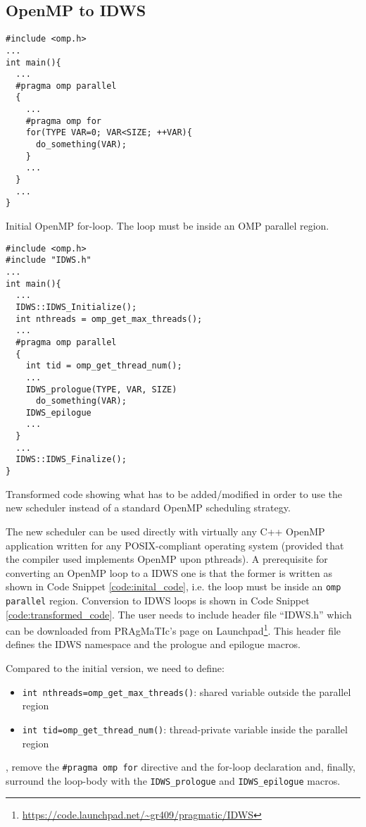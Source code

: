 \documentclass{acm_proc_article-sp}
\newcommand{\PRAGMATIC}{PRAgMaTIc\xspace}
\begin{document}
\subsection{OpenMP to IDWS}
\label{subsect:conversion}
\begin{code}[h]
\begin{lstlisting}
#include <omp.h>
...
int main(){
  ...
  #pragma omp parallel
  {
    ...
    #pragma omp for
    for(TYPE VAR=0; VAR<SIZE; ++VAR){
      do_something(VAR);
    }
    ...
  }
  ...
}
\end{lstlisting}
\caption{Initial OpenMP for-loop. The loop must be inside an OMP parallel 
region.}
\label{code:inital_code}
\end{code}

\begin{code}[h]
\begin{lstlisting}
#include <omp.h>
#include "IDWS.h"
...
int main(){
  ...
  IDWS::IDWS_Initialize();
  int nthreads = omp_get_max_threads();
  ...
  #pragma omp parallel
  {
    int tid = omp_get_thread_num();
    ...
    IDWS_prologue(TYPE, VAR, SIZE)
      do_something(VAR);
    IDWS_epilogue
    ...
  }
  ...
  IDWS::IDWS_Finalize();
}
\end{lstlisting}
\caption{Transformed code showing what has to be added/modified in order to use 
the new scheduler instead of a standard OpenMP scheduling strategy.}
\label{code:transformed_code}
\end{code}

The new scheduler can be used directly with virtually any C++ OpenMP 
application written for any POSIX-compliant operating system (provided that the 
compiler used implements OpenMP upon pthreads). A prerequisite for converting 
an OpenMP loop to a IDWS one is that the former is written as shown in Code 
Snippet \ref{code:inital_code}, i.e. the loop must be inside an \texttt{omp 
parallel} region. Conversion to IDWS loops is shown in Code Snippet 
\ref{code:transformed_code}. The user needs to include header file ``IDWS.h'' 
which can be downloaded from \PRAGMATIC's page  on 
Launchpad\footnote{\url{https://code.launchpad.net/~gr409/pragmatic/IDWS}}. 
This header file defines the IDWS namespace and the prologue and epilogue 
macros.

Compared to the initial version, we need to define:
\begin{itemize}
\item \texttt{int nthreads=omp\_get\_max\_threads()}: shared variable outside 
the parallel region
\item \texttt{int tid=omp\_get\_thread\_num()}: thread-private variable inside 
the parallel region
\end{itemize}
, remove the \texttt{\#pragma omp for} directive and the for-loop declaration 
and, finally, surround the loop-body with the \texttt{IDWS\_prologue} and 
\texttt{IDWS\_epilogue} macros.
\end{document}
